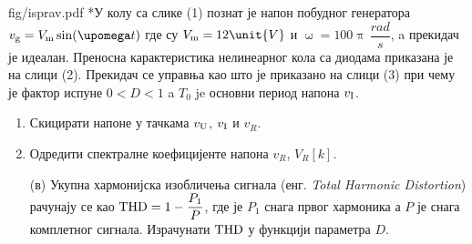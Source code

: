 \begin{slikaDesno}{fig/isprav.pdf}
{\color{red}*}\PID У колу са слике (1) познат је напон побудног 
генератора 
$v_{\rm g} = V_{\rm m} \sin(\upomega t)$ где су 
$V_{\rm m} = 12 \unit{V}$ и $\upomega = 
100\uppi \unit{\,\dfrac{rad}{s}}$, a 
прекидач је идеалан. Преносна карактеристика
нелинеарног кола са диодама приказана је на слици 
(2). Прекидач се управња као што је приказано на 
слици (3) при чему је 
фактор испуне $0 < D < 1$ a 
$T_0$ je основни период напона $v_{\rm I}$.
\begin{enumerate}[label=(\alph*)]
\item Скицирати напоне у тачкама $v_{\rm U}$, 
$v_{\rm I}$ и $v_{R}$. 
\item Одредити 
спектралне коефицијенте напона $v_{R}$, 
$V_{R}[k]$. 
\end{enumerate}
\end{slikaDesno}
\begin{enumerate}[label=(\alph*)]
    \item[(в)] Укупна хармонијска изобличења сигнала 
    (енг. \textit{Total Harmonic Distortion})
    рачунају се као 
    ${\rm THD} = 1 - \dfrac{P_1}{P}$, \vspace*{1mm} где је $P_1$ снага првог 
    хармоника а $P$ је снага комплетног сигнала. Израчунати 
    ${\rm THD}$ у функцији параметра $D$.
    \end{enumerate}

\vspace*{2mm}

